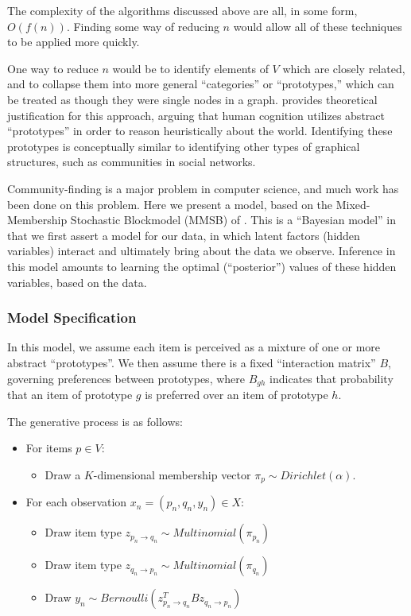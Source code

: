 The complexity of the algorithms discussed above are all, in some form, $O(f(n))$.
Finding some way of reducing $n$ would allow all of these techniques to be applied more quickly.

\bigskip

One way to reduce $n$ would be to identify elements of $V$ which are closely related, and to collapse them into more general ``categories'' or ``prototypes,'' which can be treated as though they were single nodes in a graph.
\cite{rosch:1973} provides theoretical justification for this approach, arguing that human cognition utilizes abstract ``prototypes'' in order to reason heuristically about the world.
Identifying these prototypes is conceptually similar to identifying other types of graphical structures, such as communities in social networks.

Community-finding is a major problem in computer science, and much work has been done on this problem.
Here we present a model, based on the Mixed-Membership Stochastic Blockmodel (MMSB) of \cite{airoldi:2008}.
This is a ``Bayesian model'' in that we first assert a model for our data, in which latent factors (hidden variables) interact and ultimately bring about the data we observe.
Inference in this model amounts to learning the optimal (``posterior'') values of these hidden variables, based on the data.

\subsubsection{Model Specification}

In this model, we assume each item is perceived as a mixture of one or more abstract ``prototypes''.
We then assume there is a fixed ``interaction matrix'' $B$, governing preferences between prototypes, where $B_{gh}$ indicates that probability that an item of prototype $g$ is preferred over an item of prototype $h$.

\bigskip

The generative process is as follows:
\begin{itemize}
	\item For items $p \in V$:
	\begin{itemize}
		\item Draw a $K$-dimensional membership vector $\pi_p \sim Dirichlet(\alpha)$.
	\end{itemize}
	\item For each observation $x_n = (p_n, q_n, y_n) \in X$:
	\begin{itemize}
		\item Draw item type $z_{p_n \rightarrow q_n} \sim Multinomial(\pi_{p_n})$
		\item Draw item type $z_{q_n \rightarrow p_n} \sim Multinomial(\pi_{q_n})$
		\item Draw $y_n \sim Bernoulli(z_{p_n \rightarrow q_n}^TBz_{q_n \rightarrow p_n})$
	\end{itemize}
\end{itemize}


